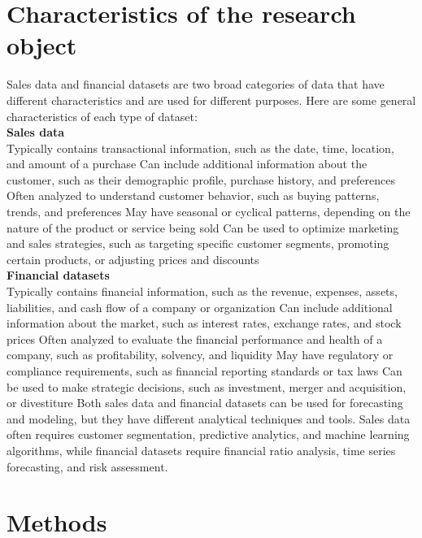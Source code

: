 \section{Characteristics of the research object} \label{subsec:research_object}
Sales data and financial datasets are two broad categories of data that have different characteristics and are used for different purposes.
Here are some general characteristics of each type of dataset:
\\
\textbf{Sales data}\\
Typically contains transactional information, such as the date, time, location, and amount of a purchase
Can include additional information about the customer, such as their demographic profile, purchase history, and preferences
Often analyzed to understand customer behavior, such as buying patterns, trends, and preferences
May have seasonal or cyclical patterns, depending on the nature of the product or service being sold
Can be used to optimize marketing and sales strategies, such as targeting specific customer segments, promoting certain products, or adjusting prices and discounts
\\
\textbf{Financial datasets}\\
Typically contains financial information, such as the revenue, expenses, assets, liabilities, and cash flow of a company or organization
Can include additional information about the market, such as interest rates, exchange rates, and stock prices
Often analyzed to evaluate the financial performance and health of a company, such as profitability, solvency, and liquidity
May have regulatory or compliance requirements, such as financial reporting standards or tax laws
Can be used to make strategic decisions, such as investment, merger and acquisition, or divestiture
Both sales data and financial datasets can be used for forecasting and modeling, but they have different analytical
techniques and tools. Sales data often requires customer segmentation, predictive analytics, and machine learning algorithms,
while financial datasets require financial ratio analysis, time series forecasting, and risk assessment.
\section{Methods} \label{subsec:methods}
